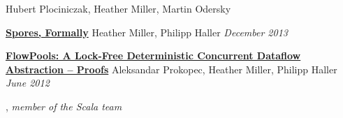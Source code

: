 \documentclass[9pt]{article}
\begin{document}
\dates{}
\newline\noindent Hubert Plociniczak, Heather Miller, Martin Odersky
\medskip



\noindent\href{http://infoscience.epfl.ch/record/191240}{\bf Spores, Formally}\dates{}
\newline\noindent Heather Miller, Philipp Haller
\newline\noindent\emph{December 2013}
\medskip

\noindent\href{http://infoscience.epfl.ch/record/181098}{\bf  FlowPools: A Lock-Free Deterministic Concurrent Dataflow Abstraction -- Proofs}\dates{}
\newline\noindent Aleksandar Prokopec, Heather Miller, Philipp Haller
\newline\noindent\emph{June 2012}
\medskip

\medskip
{}

\vspace{0.01in}
, {\em member of the Scala team} 
\end{document}
